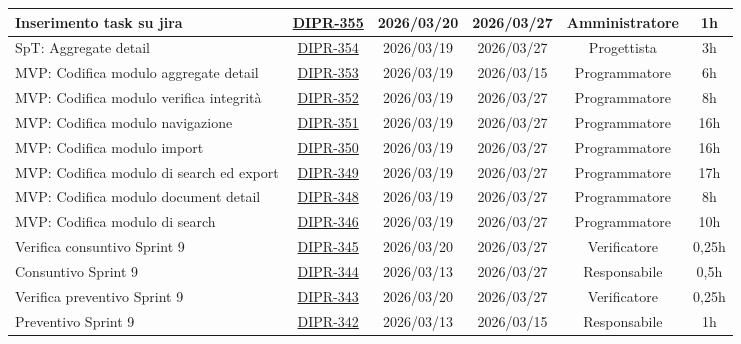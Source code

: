 \documentclass[a4paper,12pt]{article}
\begin{document}
\begin{spacing}{1}
\begin{longtable}{|p{4cm}|c|c|c|c|c|}
        \hline
        Inserimento task su jira & \href{https://7zpus.atlassian.net/browse/DIPR-355}{DIPR-355} & 2026/03/20 & 2026/03/27 & Amministratore & 1h \\
        \hline
        [FRONTEND] SpT: Aggregate detail & \href{https://7zpus.atlassian.net/browse/DIPR-354}{DIPR-354} & 2026/03/19 & 2026/03/27 & Progettista & 3h \\
        \hline
        [FRONTEND] MVP: Codifica modulo aggregate detail & \href{https://7zpus.atlassian.net/browse/DIPR-353}{DIPR-353} & 2026/03/19 & 2026/03/15 & Programmatore & 6h \\
        \hline
        [FRONTEND] MVP: Codifica modulo verifica integrità & \href{https://7zpus.atlassian.net/browse/DIPR-352}{DIPR-352} & 2026/03/19 & 2026/03/27 & Programmatore & 8h \\
        \hline
        [FRONTEND] MVP: Codifica modulo navigazione & \href{https://7zpus.atlassian.net/browse/DIPR-351}{DIPR-351} & 2026/03/19 & 2026/03/27 & Programmatore & 16h \\
        \hline
        [FRONTEND] MVP: Codifica modulo import & \href{https://7zpus.atlassian.net/browse/DIPR-350}{DIPR-350}& 2026/03/19 & 2026/03/27 & Programmatore & 16h \\
        \hline
        [BACKEND] MVP: Codifica modulo di search ed export & \href{https://7zpus.atlassian.net/browse/DIPR-349}{DIPR-349} & 2026/03/19 & 2026/03/27 & Programmatore & 17h \\
        \hline
        [FRONTEND] MVP: Codifica modulo document detail & \href{https://7zpus.atlassian.net/browse/DIPR-348}{DIPR-348} & 2026/03/19 & 2026/03/27 & Programmatore & 8h \\
        \hline
        [FRONTEND] MVP: Codifica modulo di search & \href{https://7zpus.atlassian.net/browse/DIPR-346}{DIPR-346} & 2026/03/19 & 2026/03/27 & Programmatore & 10h \\
        \hline
        Verifica consuntivo Sprint 9 & \href{https://7zpus.atlassian.net/browse/DIPR-345}{DIPR-345} & 2026/03/20 & 2026/03/27 & Verificatore & 0,25h \\
        \hline
        Consuntivo Sprint 9 & \href{https://7zpus.atlassian.net/browse/DIPR-344}{DIPR-344} & 2026/03/13 & 2026/03/27 & Responsabile & 0,5h \\
        \hline
        Verifica preventivo Sprint 9 & \href{https://7zpus.atlassian.net/browse/DIPR-343}{DIPR-343} & 2026/03/20 & 2026/03/27 & Verificatore & 0,25h \\
        \hline
        Preventivo Sprint 9 & \href{https://7zpus.atlassian.net/browse/DIPR-342}{DIPR-342} & 2026/03/13 & 2026/03/15 & Responsabile & 1h \\

\end{longtable}
\end{spacing}
\end{document}
